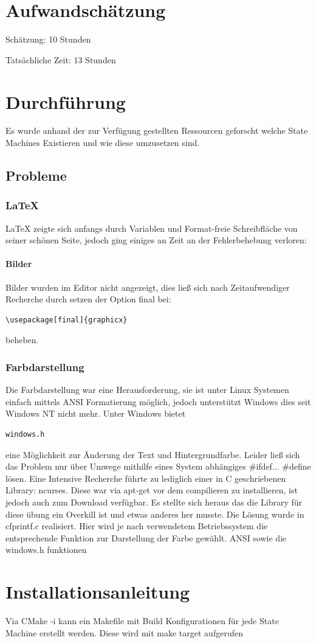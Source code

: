 \documentclass[12pt,a4paper,draft]{report}
\begin{document}
\chapter{Aufwandschätzung}


Schätzung: 10 Stunden\newline

Tatsächliche Zeit: 13 Stunden\newline

\chapter{Durchführung}
Es wurde anhand der zur Verfügung gestellten Ressourcen geforscht welche State Machines Existieren und wie diese umzusetzen sind.\newline

\section{Probleme}
\subsection{LaTeX}
LaTeX zeigte sich anfangs durch Variablen und Format-freie Schreibfläche von seiner schönen Seite, jedoch ging einiges an Zeit an der Fehlerbehebung verloren:
\subsubsection{Bilder}Bilder wurden im Editor nicht angezeigt, dies ließ sich nach Zeitaufwendiger Recherche durch setzen der Option final bei: 
\begin{verbatim}
\usepackage[final]{graphicx}
\end{verbatim}
beheben.
\newpage
\subsection{Farbdarstellung}
Die Farbdarstellung war eine Herausforderung, sie ist unter Linux Systemen einfach mittels ANSI Formatierung möglich, jedoch unterstützt Windows dies seit Windows NT nicht mehr. \newline Unter Windows bietet \begin{verbatim}
windows.h
\end{verbatim} eine Möglichkeit zur Änderung der Text und Hintergrundfarbe. \newline
Leider ließ sich das Problem nur über Umwege mithilfe eines System abhängiges \#ifdef... \#define lösen. \newline
Eine Intensive Recherche führte zu lediglich einer in C geschriebenen Library: ncurses.
Diese war via apt-get vor dem compilieren zu installieren, ist jedoch auch zum Download verfügbar.\newline
Es stellte sich heraus das die Library für diese übung ein Overkill ist und etwas anderes her musste. \newline
Die Lösung wurde in cfprintf.c realisiert. Hier wird je nach verwendetem Betriebssystem die entsprechende Funktion zur Darstellung der Farbe gewählt. ANSI sowie die windows.h funktionen


\chapter{Installationsanleitung}
Via CMake -i kann ein Makefile mit Build Konfigurationen für jede State Machine erstellt werden.\newline
Diese wird mit make target aufgerufen
\end{document}

